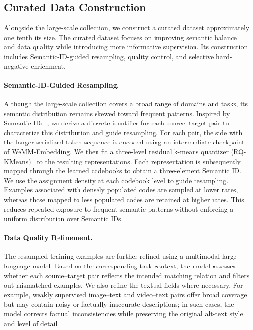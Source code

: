 \documentclass[]{wechat}
\begin{document}
\subsection{Curated Data Construction}
\label{sec:data_refinement}

Alongside the large-scale collection, we construct a curated dataset approximately one tenth its size. The curated dataset focuses on improving semantic balance and data quality while introducing more informative supervision. Its construction includes Semantic-ID-guided resampling, quality control, and selective hard-negative enrichment.

\paragraph{Semantic-ID-Guided Resampling.}

Although the large-scale collection covers a broad range of domains and tasks, its semantic distribution remains skewed toward frequent patterns. Inspired by Semantic IDs~\citep{tiger}, we derive a discrete identifier for each source--target pair to characterize this distribution and guide resampling. For each pair, the side with the longer serialized token sequence is encoded using an intermediate checkpoint of WeMM-Embedding. We then fit a three-level residual k-means quantizer (RQ-KMeans)~\citep{rq-kmeans} to the resulting representations. Each representation is subsequently mapped through the learned codebooks to obtain a three-element Semantic ID.
We use the assignment density at each codebook level to guide resampling. Examples associated with densely populated codes are sampled at lower rates, whereas those mapped to less populated codes are retained at higher rates. This reduces repeated exposure to frequent semantic patterns without enforcing a uniform distribution over Semantic IDs.


\paragraph{Data Quality Refinement.}

The resampled training examples are further refined using a multimodal large language model. Based on the corresponding task context, the model assesses whether each source--target pair reflects the intended matching relation and filters out mismatched examples. We also refine the textual fields where necessary. For example, weakly supervised image--text and video--text pairs offer broad coverage but may contain noisy or factually inaccurate descriptions; in such cases, the model corrects factual inconsistencies while preserving the original alt-text style and level of detail.
\end{document}
